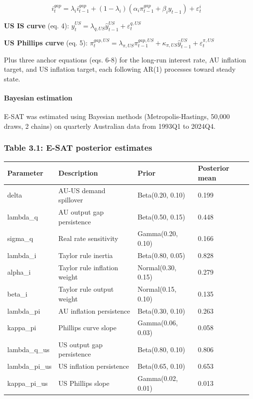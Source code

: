 \documentclass[
]{article}
\newcounter{none} %
\begin{document}
\[i^{gap}_t = \lambda_i i^{gap}_{t-1} + (1-\lambda_i)(\alpha_i \pi^{gap}_{t-1} + \beta_i \hat{y}_{t-1}) + \varepsilon^i_t\]

\textbf{US IS curve} (eq. 4):
\(\hat{y}^{US}_t = \lambda_{q,US} \hat{y}^{US}_{t-1} + \varepsilon^{q,US}_t\)

\textbf{US Phillips curve} (eq. 5):
\(\pi^{gap,US}_t = \lambda_{\pi,US} \pi^{gap,US}_{t-1} + \kappa_{\pi,US} \hat{y}^{US}_{t-1} + \varepsilon^{\pi,US}_t\)

Plus three anchor equations (eqs. 6-8) for the long-run interest rate,
AU inflation target, and US inflation target, each following AR(1)
processes toward steady state.

\paragraph{Bayesian estimation}\label{bayesian-estimation}

E-SAT was estimated using Bayesian methods (Metropolis-Hastings, 50,000
draws, 2 chains) on quarterly Australian data from 1993Q1 to 2024Q4.

\subsubsection{Table 3.1: E-SAT posterior
estimates}\label{table-3.1-e-sat-posterior-estimates}

{\def\LTcaptype{none} %
\begin{longtable}[]{@{}llll@{}}
\toprule\noalign{}
Parameter & Description & Prior & Posterior mean \\
\midrule\noalign{}
\endhead
\bottomrule\noalign{}
\endlastfoot
delta & AU-US demand spillover & Beta(0.20, 0.10) & 0.199 \\
lambda\_q & AU output gap persistence & Beta(0.50, 0.15) & 0.448 \\
sigma\_q & Real rate sensitivity & Gamma(0.20, 0.10) & 0.166 \\
lambda\_i & Taylor rule inertia & Beta(0.80, 0.05) & 0.828 \\
alpha\_i & Taylor rule inflation weight & Normal(0.30, 0.15) & 0.279 \\
beta\_i & Taylor rule output weight & Normal(0.15, 0.10) & 0.135 \\
lambda\_pi & AU inflation persistence & Beta(0.30, 0.10) & 0.263 \\
kappa\_pi & Phillips curve slope & Gamma(0.06, 0.03) & 0.058 \\
lambda\_q\_us & US output gap persistence & Beta(0.80, 0.10) & 0.806 \\
lambda\_pi\_us & US inflation persistence & Beta(0.65, 0.10) & 0.653 \\
kappa\_pi\_us & US Phillips slope & Gamma(0.02, 0.01) & 0.013 \\
\end{longtable}
}
\end{document}
